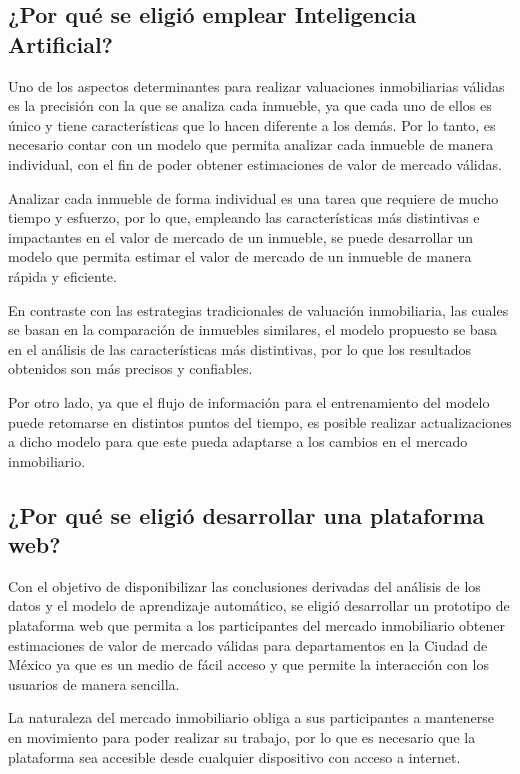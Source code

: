 \subsection{¿Por qué se eligió emplear Inteligencia Artificial?}

Uno de los aspectos determinantes para realizar valuaciones inmobiliarias válidas
es la precisión con la que se analiza cada inmueble, ya que cada uno de ellos es
único y tiene características que lo hacen diferente a los demás. Por lo tanto,
es necesario contar con un modelo que permita analizar cada inmueble de manera
individual, con el fin de poder obtener estimaciones de valor de mercado válidas.

Analizar cada inmueble de forma individual es una tarea que requiere de mucho
tiempo y esfuerzo, por lo que, empleando las características más distintivas
e impactantes en el valor de mercado de un inmueble, se puede desarrollar un
modelo que permita estimar el valor de mercado de un inmueble de manera rápida
y eficiente.

En contraste con las estrategias tradicionales de valuación inmobiliaria, las
cuales se basan en la comparación de inmuebles similares, el modelo propuesto
se basa en el análisis de las características más distintivas, por lo que los
resultados obtenidos son más precisos y confiables.

Por otro lado, ya que el flujo de información para el entrenamiento del modelo
puede retomarse en distintos puntos del tiempo, es posible realizar actualizaciones
a dicho modelo para que este pueda adaptarse a los cambios en el mercado inmobiliario.

\subsection{¿Por qué se eligió desarrollar una plataforma web?}

Con el objetivo de disponibilizar las conclusiones derivadas del análisis de los
datos y el modelo de aprendizaje automático, se eligió desarrollar un prototipo
de plataforma web que permita a los participantes del mercado inmobiliario
obtener estimaciones de valor de mercado válidas para departamentos en la Ciudad
de México ya que es un medio de fácil acceso y que permite la interacción con
los usuarios de manera sencilla.

La naturaleza del mercado inmobiliario obliga a sus participantes a mantenerse
en movimiento para poder realizar su trabajo, por lo que es necesario que la
plataforma sea accesible desde cualquier dispositivo con acceso a internet.


